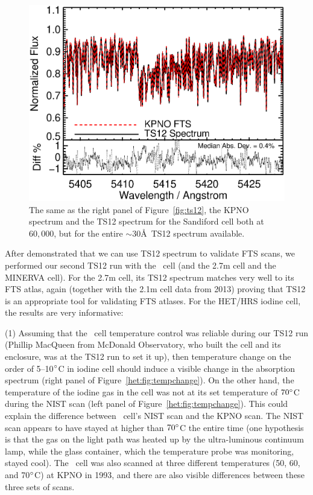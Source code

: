 \begin{figure}[!th]
\centering
\includegraphics[angle=0.,scale=0.45]{het/all_60k_gaus_sclrem_diff.eps}
\caption{The same as the right panel of Figure~\ref{fig:ts12}, the
KPNO spectrum and the TS12 spectrum for the Sandiford cell both at
$60,000$, but for the entire $\sim$30\AA\ TS12 spectrum available. 
  \label{fig:60k_all}}
\end{figure}


After demonstrated that we can use TS12 spectrum to validate FTS
scans, we performed our second TS12 run with the \het\ cell (and the
2.7m cell and the MINERVA cell). For
the 2.7m cell, its TS12 spectrum matches very well to its FTS atlas,
again (together with the 2.1m cell data from 2013) proving that TS12
is an appropriate tool for validating FTS atlases. For the HET/HRS
iodine cell, the results are very informative:

(1) Assuming that the \het\ cell temperature control was reliable
during our TS12 run (Phillip MacQueen from McDonald Observatory, who
built the cell and its enclosure, was at the TS12 run to set it up),
then temperature change on the order of 5--10$^{\circ}$C in iodine cell
should induce a visible change in the absorption spectrum (right panel
of Figure~\ref{het:fig:tempchange}). On the other hand, the
temperature of the iodine gas in the cell was not at its set
temperature of $70^{\circ}$C during the NIST scan (left panel of
Figure~\ref{het:fig:tempchange}). This could explain the difference
between \het\ cell's NIST scan and the KPNO scan. The NIST scan
appears to have stayed at higher than $70^{\circ}$C the entire time
(one hypothesis is that the gas on the light path was heated up by the
ultra-luminous continuum lamp, while the glass container, which the
temperature probe was monitoring, stayed cool). The \keck\ cell was
also scanned at three different temperatures (50, 60, and
70$^{\circ}$C) at KPNO in 1993, and there are also visible differences
between these three sets of scans.


